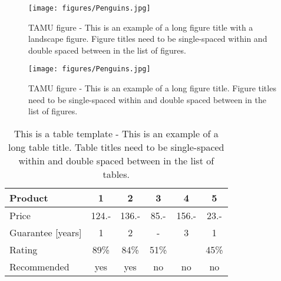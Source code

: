 

\begin{sidewaysfigure}[H]
\centering
\texttt{[image: figures/Penguins.jpg]}
\caption{TAMU figure - This is an example of a long figure title with a landscape figure.  Figure titles need to be single-spaced within and double spaced between in the list of figures.}
\label{fig:tamu-fig1-1}
\end{sidewaysfigure}
\begin{figure}[H]
\centering
\texttt{[image: figures/Penguins.jpg]}
\caption{TAMU figure - This is an example of a long figure title.  Figure titles need to be single-spaced within and double spaced between in the list of figures.}
\label{fig:landscapepenguins}
\end{figure}
\begin{table}[H]
\centering
\caption{This is a table template - This is an example of a long table title.  Table titles need to be single-spaced within and double spaced between in the list of tables.}
\begin{tabular}{|l|c|c|c|c|c|}
\hline
Product & 1 & 2 & 3 & 4 & 5\\
\hline
Price & 124.- & 136.- & 85.- & 156.- & 23.-\\
Guarantee [years] & 1 & 2 & - & 3 & 1\\
Rating & 89\% & 84\% & 51\% & & 45\%\\
\hline
\hline
Recommended & yes & yes & no & no & no\\
\hline
\end{tabular}
\label{tab:template1}
\end{table}
